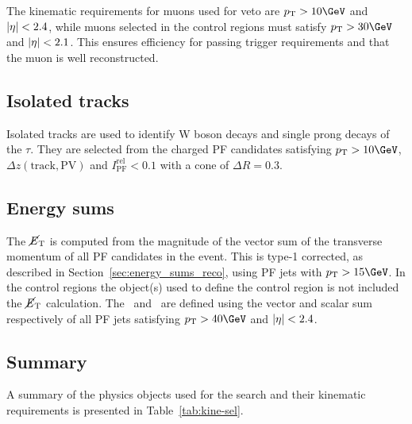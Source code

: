 The kinematic requirements for muons used for veto are $\pt > 10\GeV$ and $|\eta| < 2.4$, while muons 
selected in the control regions must satisfy $\pt > 30\GeV$ and $|\eta| < 2.1$. This ensures efficiency
for passing trigger requirements and that the muon is well reconstructed.


\subsection{Isolated tracks}

Isolated tracks are used to identify W boson decays and single prong decays of the $\tau$. 
They are selected from the charged PF candidates satisfying $\pt > 10\GeV$, $\Delta z(\text{track},\text{PV})$ and 
$I_{\text{PF}}^{\text{rel}} < 0.1$ with a cone of $\Delta R = 0.3$.

\subsection{Energy sums}

The $\mbox{$\cancel{E}_\text{T}$}$ is computed from the magnitude of the vector sum of the transverse momentum of all PF candidates in
the event. This is type-1 corrected, as described in Section~\ref{sec:energy_sums_reco}, 
using PF jets with $\pt > 15\GeV$. In the control regions the object(s) used to define
the control region is not included the $\mbox{$\cancel{E}_\text{T}$}$ calculation. The \mht~and \scalht~are defined
using the vector and scalar sum respectively of all PF jets satisfying $\pt > 40 \GeV$ and $|\eta| < 2.4$.

\subsection{Summary}

A summary of the physics objects used for the \alphat search and their
kinematic requirements is presented in Table~\ref{tab:kine-sel}.

